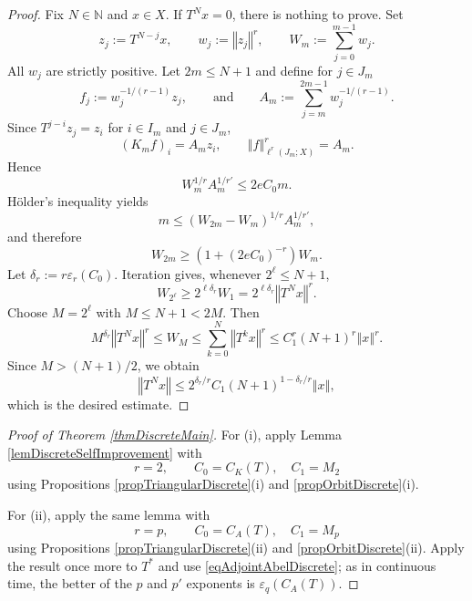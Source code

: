 \documentclass[12pt]{amsart}
\theoremstyle{plain}
\theoremstyle{remark}
\theoremstyle{definition}
\newcommand{\N}{\mathbb{N}}
\newcommand{\norm}[1]{\left\Vert #1\right\Vert}
\begin{document}
	\begin{proof}
		Fix $N\in\N$ and $x\in X$.  If $T^Nx=0$, there is nothing to prove.  Set
		\[
		z_j:=T^{N-j}x,
		\qquad
		w_j:=\norm{z_j}^r,
		\qquad
		W_m:=\sum_{j=0}^{m-1}w_j.
		\]
		All $w_j$ are strictly positive.  Let $2m\le N+1$ and define for $j\in J_m$
		\[
		f_j:=w_j^{-1/(r-1)}z_j,
		\qquad \text{and}
		\qquad
		A_m:=\sum_{j=m}^{2m-1}w_j^{-1/(r-1)}.
		\]
		Since $T^{j-i}z_j=z_i$ for $i\in I_m$ and $j\in J_m$,
		\[
		(K_mf)_i=A_mz_i,
		\qquad
		\norm{f}_{\ell^r(J_m;X)}^r=A_m.
		\]
		Hence
		\begin{equation*}\label{eqAbstractArDiscrete}
			W_m^{1/r}A_m^{1/r'}
			\le
			2eC_0m.
		\end{equation*}
		H\"older's inequality yields
		\[
		m
		\le
		(W_{2m}-W_m)^{1/r}A_m^{1/r'},
		\]
		and therefore
		\begin{equation*}\label{eqAbstractDoublingDiscrete}
			W_{2m}
			\ge
			\left(1+(2eC_0)^{-r}\right)W_m.
		\end{equation*}
		Let $
		\delta_r:=r\varepsilon_r(C_0).$ Iteration gives, whenever $2^\ell\le N+1$,
		\[
		W_{2^\ell}
		\ge
		2^{\ell\delta_r}W_1
		=
		2^{\ell\delta_r}\norm{T^Nx}^r.
		\]
		Choose $M=2^\ell$ with $M\le N+1<2M$.  Then
		\[
		M^{\delta_r}\norm{T^Nx}^r
		\le
		W_M
		\le
		\sum_{k=0}^{N}\norm{T^kx}^r
		\le
		C_1^r(N+1)^r\norm{x}^r.
		\]
		Since $M>(N+1)/2$, we obtain
		\[
		\norm{T^Nx}
		\le
		2^{\delta_r/r}C_1(N+1)^{1-\delta_r/r}\norm{x},
		\]
		which is the desired estimate.
	\end{proof}
	
	\begin{proof}[Proof of Theorem \ref{thmDiscreteMain}]
		For (i), apply Lemma \ref{lemDiscreteSelfImprovement} with
		\[
		r=2,
		\qquad
		C_0=C_K(T), \quad C_1 = M_2
		\]
		using Propositions \ref{propTriangularDiscrete}(i) and
		\ref{propOrbitDiscrete}(i).
		
		For (ii), apply the same lemma with
		\[
		r=p,
		\qquad
		C_0=C_A(T), \quad C_1 = M_p
		\]
		using Propositions \ref{propTriangularDiscrete}(ii) and
		\ref{propOrbitDiscrete}(ii).  Apply the result once more to $T^*$ and use
		\eqref{eqAdjointAbelDiscrete}; as in continuous time, the better of the
		$p$ and $p'$ exponents is $\varepsilon_q(C_A(T))$. 
	\end{proof}
	
	
	
	
	
	
	
	
\end{document}
